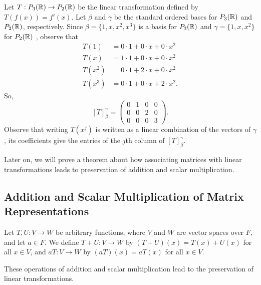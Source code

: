 \begin{eg}
    Let \( T: {P}_{3}(\mathbb{R}) \to {P}_{2}(\mathbb{R}) \) be the linear transformation defined by \( T(f(x)) = f'(x) \). Let \( \beta \) and \( \gamma  \) be the standard ordered bases for \( {P}_{3}(\mathbb{R}) \) and \( {P}_{2}(\mathbb{R}) \), respectively. Since \( \beta = \{ 1, x , x^{2}, x^{3} \}  \) is a basis for \( {P}_{3}(\mathbb{R}) \) and \( \gamma = \{ 1,x,x^{2} \}  \) for \( {P}_{2}(\mathbb{R}) \) , observe that
    \begin{align*}
        T(1) &= 0 \cdot 1 + 0 \cdot x + 0 \cdot x^{2} \\
        T(x) &= 1 \cdot 1 + 0 \cdot x + 0 \cdot x^{2} \\
        T(x^{2}) &= 0 \cdot 1 + 2 \cdot x + 0 \cdot x^{2} \\
        T(x^{3}) &= 0 \cdot 1 + 0 \cdot x + 2 \cdot x^{2}.
    \end{align*}
    So, 
    \[  [T]_{\beta}^{\gamma}  = \begin{pmatrix}
        0 & 1 & 0 & 0 \\
        0 & 0 & 2 & 0 \\
        0 & 0 & 0 & 3
    \end{pmatrix}. \]
    Observe that writing \( T(x^{j}) \) is written as a linear combination of the vectors of \( \gamma  \), its coefficients give the entries of the \( j \)th column of \( {[T]}_{\beta}^{\gamma} \).
\end{eg}

Later on, we will prove a theorem about how associating matrices with linear transformations leads to preservation of addition and scalar multiplication. 

\subsection{Addition and Scalar Multiplication of Matrix Representations}

\begin{definition}
   Let \( T, U: V \to W  \) be arbitrary functions, where \( V  \) and \( W  \) are vector spaces over \( F  \), and let \( a \in F  \). We define \( T + U : V \to W  \) by \( (T+U)(x) =  T(x) + U(x)   \) for all \( x \in V  \), and \( aT: V \to W  \) by \( (aT)(x) = aT(x) \) for all \( x \in V  \). 
\end{definition}

These operations of addition and scalar multiplication lead to the preservation of linear transformations.

